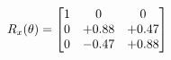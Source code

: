\documentclass[preview]{standalone}
\begin{document}
\begin{align*}
\special{dvisvgm:raw <g id='unique000'>}R_{x}(\theta) = \begin{bmatrix}1 & 0 & 0 \\0 & +0.88 & +0.47 \\0 & -0.47 & +0.88\end{bmatrix}\special{dvisvgm:raw </g>}
\end{align*}
\end{document}
